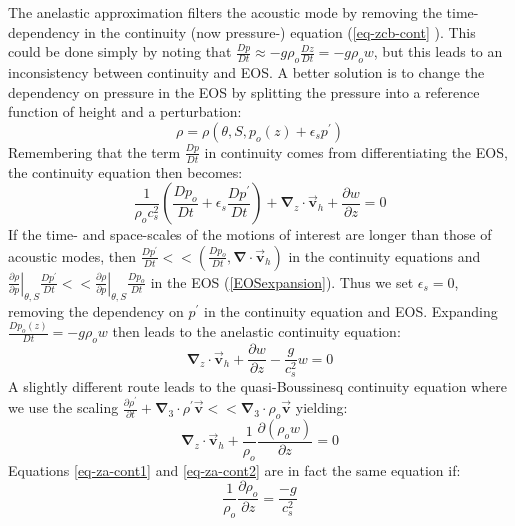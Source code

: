 \documentclass[12pt]{book}
\begin{document}
The anelastic approximation filters the acoustic mode by removing the
time-dependency in the continuity (now pressure-) equation (\ref{eq-zcb-cont}
). This could be done simply by noting that $\frac{Dp}{Dt}\approx -g\rho _{o}
\frac{Dz}{Dt}=-g\rho _{o}w$, but this leads to an inconsistency between
continuity and EOS. A better solution is to change the dependency on
pressure in the EOS by splitting the pressure into a reference function of
height and a perturbation: 
\begin{equation*}
\rho =\rho (\theta ,S,p_{o}(z)+\epsilon _{s}p^{\prime })
\end{equation*}
Remembering that the term $\frac{Dp}{Dt}$ in continuity comes from
differentiating the EOS, the continuity equation then becomes: 
\begin{equation*}
\frac{1}{\rho _{o}c_{s}^{2}}\left( \frac{Dp_{o}}{Dt}+\epsilon _{s}\frac{
Dp^{\prime }}{Dt}\right) +\mathbf{\nabla }_{z}\cdot \vec{\mathbf{v}}_{h}+
\frac{\partial w}{\partial z}=0
\end{equation*}
If the time- and space-scales of the motions of interest are longer than
those of acoustic modes, then $\frac{Dp^{\prime }}{Dt}<<(\frac{Dp_{o}}{Dt},
\mathbf{\nabla }\cdot \vec{\mathbf{v}}_{h})$ in the continuity equations and 
$\left. \frac{\partial \rho }{\partial p}\right| _{\theta ,S}\frac{
Dp^{\prime }}{Dt}<<\left. \frac{\partial \rho }{\partial p}\right| _{\theta
,S}\frac{Dp_{o}}{Dt}$ in the EOS (\ref{EOSexpansion}). Thus we set $\epsilon
_{s}=0$, removing the dependency on $p^{\prime }$ in the continuity equation
and EOS. Expanding $\frac{Dp_{o}(z)}{Dt}=-g\rho _{o}w$ then leads to the
anelastic continuity equation: 
\begin{equation}
\mathbf{\nabla }_{z}\cdot \vec{\mathbf{v}}_{h}+\frac{\partial w}{\partial z}-
\frac{g}{c_{s}^{2}}w=0  \label{eq-za-cont1}
\end{equation}
A slightly different route leads to the quasi-Boussinesq continuity equation
where we use the scaling $\frac{\partial \rho ^{\prime }}{\partial t}+
\mathbf{\nabla }_{3}\cdot \rho ^{\prime }\vec{\mathbf{v}}<<\mathbf{\nabla }
_{3}\cdot \rho _{o}\vec{\mathbf{v}}$ yielding: 
\begin{equation}
\mathbf{\nabla }_{z}\cdot \vec{\mathbf{v}}_{h}+\frac{1}{\rho _{o}}\frac{
\partial \left( \rho _{o}w\right) }{\partial z}=0  \label{eq-za-cont2}
\end{equation}
Equations \ref{eq-za-cont1} and \ref{eq-za-cont2} are in fact the same
equation if: 
\begin{equation}
\frac{1}{\rho _{o}}\frac{\partial \rho _{o}}{\partial z}=\frac{-g}{c_{s}^{2}}
\end{equation}
\end{document}
